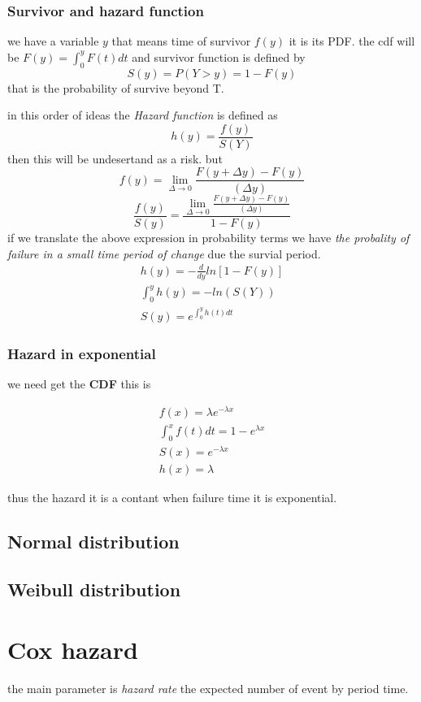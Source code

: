 \documentclass[10pt,a4paper]{article}
\begin{document}
\subsubsection{Survivor and hazard function}
we have a variable $y$ that means time of survivor $f(y)$  it is its PDF.
the cdf will be  $F(y)=\int_{0}^{y} F(t)dt$
and survivor function is defined by 
$$S(y)=P(Y>y)= 1-F(y)$$ 
that is the probability of survive beyond T.

in this order of ideas the \textit{Hazard function } is defined as 
$$ h(y)=\frac{f(y)}{S(Y)}$$
then this will be undesertand as a risk.
but 
$$ f(y)=   \lim_{\Delta \to 0}   \frac{   F(y + \Delta y) - F(y)}{(\Delta y)}$$
$$\frac{f(y)}{S(y)}= \frac{\lim_{\Delta \to 0}   \frac{ F(y + \Delta y) - F(y)}{(\Delta y)}}{1-F(y)}$$
if we translate the above expression in probability terms we have \textit{ the probality of failure in a small time period of change} due the survial period.
\begin{eqnarray}
 h(y) =-\frac{d}{dy}ln[1-F(y)] \\
\int_{0}^{y} h(y) = -ln(S(Y)) \\
S(y)=e^{\int_{0}^{y} h(t) dt}
\end{eqnarray}

\subsubsection{Hazard in exponential}
we need get the \textbf{CDF} this is 

\begin{eqnarray*}
f(x)=\lambda e^{- \lambda x }   \\
\int_{0}^{x} f(t)dt= 1 - e^{\lambda x} \\
S(x)=e^{-\lambda x} \\
h(x)= \lambda
\end{eqnarray*}

thus the hazard it is a contant when failure time it is exponential.
\subsection{Normal distribution}
\subsection{Weibull distribution}

\section{Cox hazard}
the main parameter is \textit{hazard rate}
the expected number of event by period time.
\end{document}
